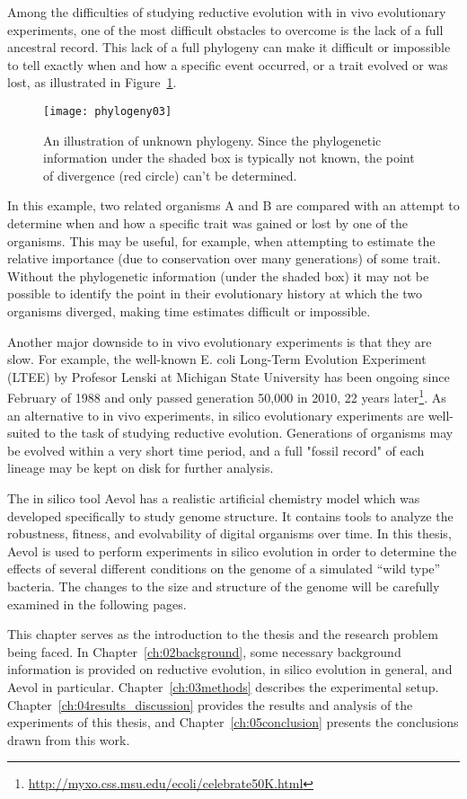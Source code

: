 Among the difficulties of studying reductive evolution with in vivo evolutionary experiments, one of the most difficult obstacles to overcome is the lack of a full ancestral record. This lack of a full phylogeny can make it difficult or impossible to tell exactly when and how a specific event occurred, or a trait evolved or was lost, as illustrated in Figure~\ref{fig:phylogeny03}. 
\begin{figure}[h]
\texttt{[image: phylogeny03]}
\centering
\caption[Unknown phylogeny]{An illustration of unknown phylogeny. Since the phylogenetic information under the shaded box is typically not known, the point of divergence (red circle) can't be determined.}
\label{fig:phylogeny03}
\end{figure}
In this example, two related organisms A and B are compared with an attempt to determine when and how a specific trait was gained or lost by one of the organisms. This may be useful, for example, when attempting to estimate the relative importance (due to conservation over many generations) of some trait. Without the phylogenetic information (under the shaded box) it may not be possible to identify the point in their evolutionary history at which the two organisms diverged, making time estimates difficult or impossible.

Another major downside to in vivo evolutionary experiments is that they are slow. For example, the well-known E. coli Long-Term Evolution Experiment (LTEE) by Profesor Lenski at Michigan State University has been ongoing since February of 1988 and only passed generation 50,000 in 2010, 22 years later\footnote{\url{http://myxo.css.msu.edu/ecoli/celebrate50K.html}}. As an alternative to in vivo experiments, in silico evolutionary experiments are well-suited to the task of studying reductive evolution. Generations of organisms may be evolved within a very short time period, and a full "fossil record" of each lineage may be kept on disk for further analysis. 

The in silico tool Aevol has a realistic artificial chemistry model which was developed specifically to study genome structure. It contains tools to analyze the robustness, fitness, and evolvability of digital organisms over time.  In this thesis, Aevol is used to perform experiments in silico evolution in order to determine the effects of several different conditions on the genome of a simulated ``wild type'' bacteria. The changes to the size and structure of the genome will be carefully examined in the following pages. 

This chapter serves as the introduction to the thesis and the research problem being faced. In Chapter~\ref{ch:02background}, some necessary background information is provided on reductive evolution, in silico evolution in general, and Aevol in particular. Chapter~\ref{ch:03methods} describes the experimental setup. Chapter~\ref{ch:04results_discussion}
provides the results and analysis of the experiments of this thesis, and Chapter~\ref{ch:05conclusion} presents the conclusions drawn from this work. 


